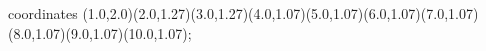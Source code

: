 					coordinates { (1.0,2.0)(2.0,1.27)(3.0,1.27)(4.0,1.07)(5.0,1.07)(6.0,1.07)(7.0,1.07)(8.0,1.07)(9.0,1.07)(10.0,1.07)};